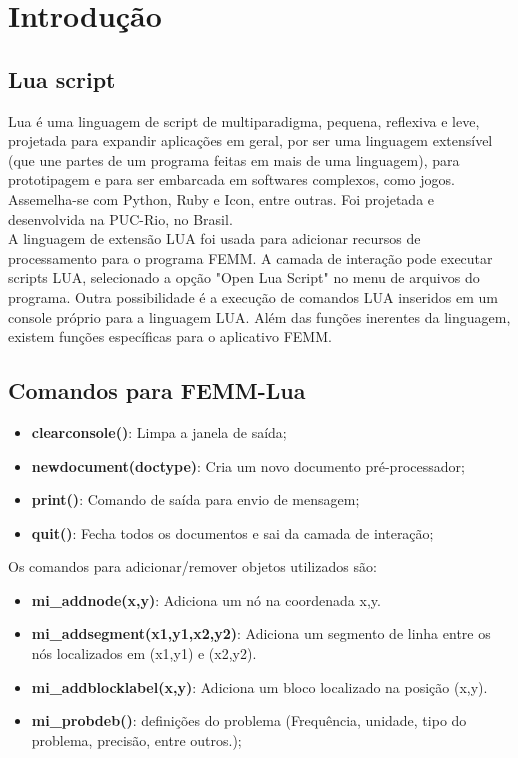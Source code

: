 \section{Introdução}
\label{cap2:introducao}
\subsection{Lua script}
Lua é uma linguagem de script de multiparadigma, pequena, reflexiva e leve, projetada para expandir aplicações em geral, por ser uma linguagem extensível (que une partes de um programa feitas em mais de uma linguagem), para prototipagem e para ser embarcada em softwares complexos, como jogos. Assemelha-se com Python, Ruby e Icon, entre outras. Foi projetada e desenvolvida na PUC-Rio, no Brasil.\\
A linguagem de extensão LUA foi usada para adicionar recursos de processamento para o programa FEMM. A camada de interação pode executar scripts LUA, selecionado a opção "Open Lua Script" no menu de arquivos do programa. Outra possibilidade é a execução de comandos LUA inseridos em um console próprio para a linguagem LUA. Além das funções inerentes da linguagem, existem funções específicas para o aplicativo FEMM.
\subsection{Comandos para FEMM-Lua}

\begin{itemize}
  \item \textbf{clearconsole()}: Limpa a janela de saída;
  \item \textbf{newdocument(doctype)}: Cria um novo documento pré-processador;
  \item \textbf{print()}: Comando de saída para envio de mensagem;
  \item \textbf{quit()}: Fecha todos os documentos e sai da camada de interação;
\end{itemize}

Os comandos para adicionar/remover objetos utilizados são:
\begin{itemize}
  \item \textbf{mi\_addnode(x,y)}: Adiciona um nó na coordenada x,y.
  \item \textbf{mi\_addsegment(x1,y1,x2,y2)}: Adiciona um segmento de linha entre os nós localizados em (x1,y1) e (x2,y2).
  \item \textbf{mi\_addblocklabel(x,y)}: Adiciona um bloco localizado na posição (x,y).
\end{itemize}

\begin{itemize}
  \item \textbf{mi\_probdeb()}: definições do problema (Frequência, unidade, tipo do problema, precisão, entre outros.);
\end{itemize}
